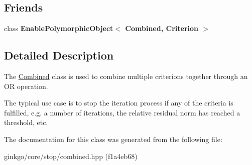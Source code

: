 \subsection*{Friends}
\begin{DoxyCompactItemize}
\item 
\mbox{\label{classgko_1_1stop_1_1Combined_a7c6977e97337814148e9c8ba5801ebf9}} 
class {\bfseries Enable\+Polymorphic\+Object$<$ Combined, Criterion $>$}
\end{DoxyCompactItemize}


\subsection{Detailed Description}
The \hyperlink{classgko_1_1stop_1_1Combined}{Combined} class is used to combine multiple criterions together through an OR operation. 

The typical use case is to stop the iteration process if any of the criteria is fulfilled, e.\+g. a number of iterations, the relative residual norm has reached a threshold, etc. 

The documentation for this class was generated from the following file\+:\begin{DoxyCompactItemize}
\item 
ginkgo/core/stop/combined.\+hpp (f1a4eb68)\end{DoxyCompactItemize}
